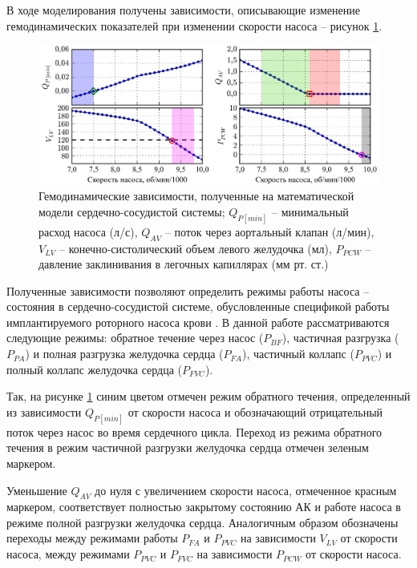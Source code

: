 В ходе моделирования получены зависимости, описывающие изменение гемодинамических показателей при изменении скорости насоса -- рисунок \ref{img:pumping_states_general}. 

\begin{figure}[ht] 
  \center
  \noindent\includegraphics [scale=1.0] {../images/c3_pumping_states_dis}
  \caption{Гемодинамические зависимости, полученные на математической модели сердечно-сосудистой системы;  $Q_{P[min]}$ -- минимальный расход насоса (л/с), $Q_{AV}$ -- поток через аортальный клапан (л/мин), $V_{LV}$ -- конечно-систолический объем левого желудочка (мл), $P_{PCW}$ -- давление заклинивания в легочных капиллярах (мм рт. ст.)} 
  \label{img:pumping_states_general}  
\end{figure}

Полученные зависимости позволяют определить режимы работы насоса -- состояния в сердечно-сосудистой системе, обусловленные спецификой работы имплантируемого роторного насоса крови \cite{ayre_identifying_2001, Karantonis_2006, Karantonis_2007, karantonis2007classification, Ng_2013}. В данной работе рассматриваются следующие режимы: обратное течение через насос ($P_{BF}$), частичная разгрузка ($P_{PA}$) и полная разгрузка желудочка сердца ($P_{FA}$), частичный коллапс ($P_{PVC}$) и полный коллапс желудочка сердца ($P_{FVC}$). 

Так, на рисунке \ref{img:pumping_states_general} синим цветом отмечен режим обратного течения, определенный из зависимости $Q_{P[min]}$ от скорости насоса и обозначающий отрицательный поток через насос во время сердечного цикла. Переход из режима обратного течения в режим частичной разгрузки желудочка сердца отмечен зеленым маркером. 

Уменьшение $Q_{AV}$ до нуля с увеличением скорости насоса, отмеченное красным маркером, соответствует полностью закрытому состоянию АК и работе насоса в режиме  полной разгрузки желудочка сердца. Аналогичным образом обозначены переходы между режимами работы $P_{FA}$ и $P_{PVC}$ на зависимости $V_{LV}$ от скорости насоса, между режимами $P_{PVC}$ и $P_{FVC}$ на зависимости $P_{PCW}$ от скорости насоса.   

